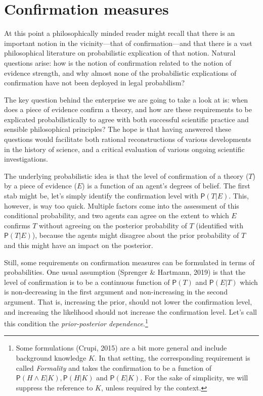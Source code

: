 \documentclass[
  10pt,
  dvipsnames,enabledeprecatedfontcommands]{scrartcl}
\newcommand{\et}{\wedge}
\newcommand{\pr}[1]{\mathsf{P}(#1)}
\begin{document}

\section{ Confirmation measures \label{sec:confirmation}}

At this point a philosophically minded reader might recall that there is
an important notion in the vicinity---that of confirmation---and that
there is a vast philosophical literature on probabilistic explication of
that notion. Natural questions arise: how is the notion of confirmation
related to the notion of evidence strength, and why almost none of the
probabilistic explications of confirmation have not been deployed in
legal probabilism?

The key question behind the enterprise we are going to take a look at
is: when does a piece of evidence confirm a theory, and how are these
requirements to be explicated probabilistically to agree with both
successful scientific practice and sensible philosophical principles?
The hope is that having answered these questions would facilitate both
rational reconstructions of various developments in the history of
science, and a critical evaluation of various ongoing scientific
investigations.

The underlying probabilistic idea is that the level of confirmation of a
theory (\(T\)) by a piece of evidence (\(E\)) is a function of an
agent's degrees of belief. The first stab might be, let's simply
identify the confirmation level with \(\pr{T \vert E}\). This, however,
is way too quick. Multiple factors come into the assessment of this
conditional probability, and two agents can agree on the extent to which
\(E\) confirms \(T\) without agreeing on the posterior probability of
\(T\) (identified with \(\pr{T \vert E}\)), because the agents might
disagree about the prior probability of \(T\) and this might have an
impact on the posterior.

Still, some requirements on confirmation measures can be formulated in
terms of probabilities. One usual assumption (Sprenger \& Hartmann,
2019) is that the level of confirmation is to be a continuous function
of \(\pr{T}\) and \(\pr{E\vert T}\) which is non-decreasing in the first
argument and non-increasing in the second argument. That is, increasing
the prior, should not lower the confirmation level, and increasing the
likelihood should not increase the confirmation level. Let's call this
condition the \emph{prior-posterior dependence}.\footnote{Some
  formulations (Crupi, 2015) are a bit more general and include
  background knowledge \(K\). In that setting, the corresponding
  requirement is called \emph{Formality} and takes the confirmation to
  be a function of \(\pr{H \et E \vert K}, \pr{H\vert K}\) and
  \(\pr{E\vert K}\). For the sake of simplicity, we will suppress the
  reference to \(K\), unless required by the context.}
\end{document}
